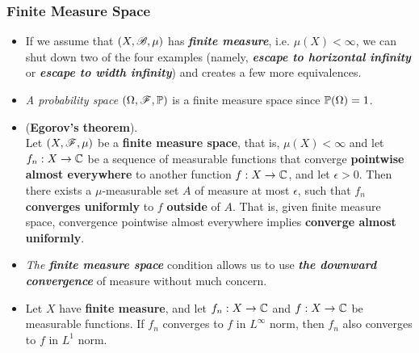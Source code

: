 \documentclass[11pt]{article}
\begin{document}
\subsubsection{Finite Measure Space}
\begin{itemize}
\item \begin{remark}
If we assume that $(X, {\mathscr B}, \mu)$ has \emph{\textbf{finite measure}}, i.e. $\mu(X) < \infty$, we can shut down two of the four examples (namely, \emph{\textbf{escape to horizontal infinity}} or \emph{\textbf{escape to width infinity}}) and creates a few more equivalences. 
\end{remark}

\item \begin{example}
\emph{A probability space} $(\Omega, {\mathscr F}, {\mathbb P})$ is a finite measure space since ${\mathbb P}(\Omega) = 1$.
\end{example}

\item \begin{theorem} (\textbf{Egorov's theorem}). \citep{royden1988real, tao2011introduction}\\
Let $(X, {\mathscr F}, \mu)$ be a \textbf{finite measure space}, that is, $\mu(X)<\infty$ and let  $f_n : X \rightarrow {\mathbb C}$ be a sequence of measurable functions that converge \textbf{pointwise almost everywhere} to another function $f : X \rightarrow {\mathbb C}$, and let $\epsilon > 0$. Then there exists a  $\mu$-measurable set $A$ of measure at most $\epsilon$, such that $f_n$ \textbf{converges  uniformly} to $f$ \textbf{outside} of $A$. That is, given finite measure space, convergence pointwise almost everywhere implies \textbf{converge almost uniformly}. 
\end{theorem}

\item \begin{remark}
\emph{The \textbf{finite measure space}} condition allows us to use \emph{\textbf{the downward convergence}} of measure without much concern.
\end{remark}

\item \begin{proposition}
Let $X$ have \textbf{finite measure}, and let $f_n : X \rightarrow {\mathbb C}$ and $f : X \rightarrow {\mathbb C}$ be measurable functions. If $f_n$ converges to $f$
in $L^{\infty}$ norm, then $f_n$ also converges to $f$ in $L^1$ norm.
\end{proposition}


\end{itemize}
\end{document}
